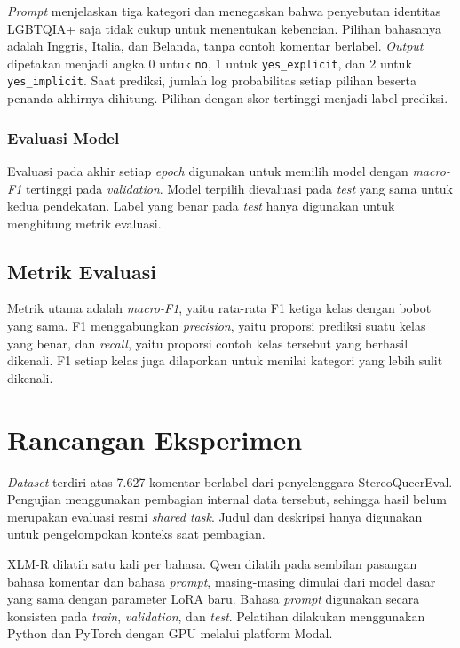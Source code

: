 \documentclass[11pt]{article}
\begin{document}
\textit{Prompt} menjelaskan tiga kategori dan menegaskan bahwa penyebutan identitas LGBTQIA+ saja tidak cukup untuk menentukan kebencian. Pilihan bahasanya adalah Inggris, Italia, dan Belanda, tanpa contoh komentar berlabel. \textit{Output} dipetakan menjadi angka 0 untuk \texttt{no}, 1 untuk \texttt{yes\_explicit}, dan 2 untuk \texttt{yes\_implicit}. Saat prediksi, jumlah log probabilitas setiap pilihan beserta penanda akhirnya dihitung. Pilihan dengan skor tertinggi menjadi label prediksi.

\subsubsection{Evaluasi Model}
Evaluasi pada akhir setiap \textit{epoch} digunakan untuk memilih model dengan \textit{macro-F1} tertinggi pada \textit{validation}. Model terpilih dievaluasi pada \textit{test} yang sama untuk kedua pendekatan. Label yang benar pada \textit{test} hanya digunakan untuk menghitung metrik evaluasi.

\subsection{Metrik Evaluasi}
Metrik utama adalah \textit{macro-F1}, yaitu rata-rata F1 ketiga kelas dengan bobot yang sama. F1 menggabungkan \textit{precision}, yaitu proporsi prediksi suatu kelas yang benar, dan \textit{recall}, yaitu proporsi contoh kelas tersebut yang berhasil dikenali. F1 setiap kelas juga dilaporkan untuk menilai kategori yang lebih sulit dikenali.

\section{Rancangan Eksperimen}
\textit{Dataset} terdiri atas 7.627 komentar berlabel dari penyelenggara StereoQueerEval. Pengujian menggunakan pembagian internal data tersebut, sehingga hasil belum merupakan evaluasi resmi \textit{shared task}. Judul dan deskripsi hanya digunakan untuk pengelompokan konteks saat pembagian.

XLM-R dilatih satu kali per bahasa. Qwen dilatih pada sembilan pasangan bahasa komentar dan bahasa \textit{prompt}, masing-masing dimulai dari model dasar yang sama dengan parameter LoRA baru. Bahasa \textit{prompt} digunakan secara konsisten pada \textit{train}, \textit{validation}, dan \textit{test}. Pelatihan dilakukan menggunakan Python dan PyTorch dengan GPU melalui platform Modal.
\end{document}
